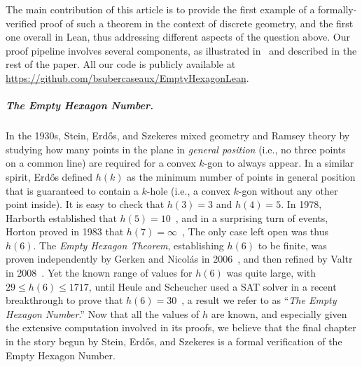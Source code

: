 
The main contribution of this article is to provide the first example of a formally-verified proof of such a theorem in the context of discrete geometry, and the first one overall in Lean, thus addressing different aspects of the question above.
Our proof pipeline involves several components, as illustrated in~ and described in the rest of the paper. All our code is publicly available at \url{https://github.com/bsubercaseaux/EmptyHexagonLean}.
\subparagraph*{The Empty Hexagon Number.}
In the 1930s, Stein, Erd\H{o}s, and Szekeres mixed geometry and Ramsey theory by studying how many points in the plane in \emph{general position} (i.e., no three points on a common line) are required for a convex $k$-gon to always appear. 
In a similar spirit, Erd\H{o}s defined $h(k)$ as the minimum number of points in general position that is guaranteed to contain a $k$-hole (i.e., a convex $k$-gon without any other point inside).
It is easy to check that $h(3) = 3$ and $h(4) = 5$. In 1978, Harborth established that $h(5) = 10$~\cite{Harborth1978}, and in a surprising turn of events, Horton proved in 1983 that $h(7) = \infty$~\cite{hortonSetsNoEmpty1983}, 
The only case left open was thus $h(6)$.
The \emph{Empty Hexagon Theorem}, establishing $h(6)$ to be finite, was proven independently by Gerken and Nicolás in 2006~\cite{gerkenEmptyConvexHexagons2008,nicolasEmptyHexagonTheorem2007}, and then refined by Valtr in 2008~\cite{valtr}.
Yet the known range of values for $h(6)$ was quite large, with $29 \leq h(6) \leq 1717$, until Heule and Scheucher used a SAT solver in a recent breakthrough to prove that $h(6) = 30$~\cite{emptyHexagonNumber}, a result we refer to as ``\emph{The Empty Hexagon Number}.''
Now that all the values of $h$ are known, and especially given the extensive computation involved in its proofs, we believe that the final chapter in the story begun by Stein, Erd\H{o}s, and Szekeres is a formal verification of the Empty Hexagon Number.

